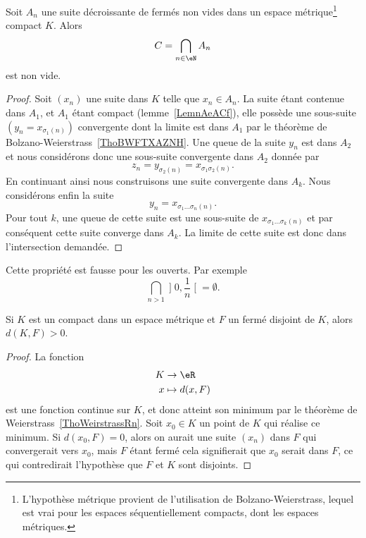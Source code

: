 \begin{lemma}       \label{LemooynkH}
	Soit \( A_n\) une suite décroissante de fermés non vides dans un espace métrique\footnote{L'hypothèse métrique provient de l'utilisation de Bolzano-Weierstrass, lequel est vrai pour les espaces séquentiellement compacts, dont les espaces métriques.} compact \( K\). Alors
	\begin{equation}
		C=\bigcap_{n\in \eN}A_n
	\end{equation}
	est non vide.
\end{lemma}

\begin{proof}
	Soit \( (x_n)\) une suite dans \( K\) telle que \( x_n\in A_n\). La suite étant contenue dans \( A_1\), et \( A_1\) étant compact (lemme~\ref{LemnAeACf}), elle possède une sous-suite \( (y_n=x_{\sigma_1(n)})\) convergente dont la limite est dans \( A_1\) par le théorème de Bolzano-Weierstrass~\ref{ThoBWFTXAZNH}. Une queue de la suite \( y_n\) est dans \( A_2\) et nous considérons donc une sous-suite convergente dans \( A_2\) donnée par
	\begin{equation}
		z_n=y_{\sigma_2(n)}=x_{\sigma_1\sigma_2(n)}.
	\end{equation}
	En continuant ainsi nous construisons une suite convergente dans \( A_k\). Nous considérons enfin la suite
	\begin{equation}
		y_n=x_{\sigma_1\ldots \sigma_n(n)}.
	\end{equation}
	Pour tout \( k\), une queue de cette suite est une sous-suite de \( x_{\sigma_1\ldots \sigma_k(n)}\) et par conséquent cette suite converge dans \( A_k\). La limite de cette suite est donc dans l'intersection demandée.
\end{proof}

\begin{remark}
	Cette propriété est fausse pour les ouverts. Par exemple
	\begin{equation}
		\bigcap_{n>1}\mathopen] 0 , \frac{1}{ n } \mathclose[=\emptyset.
	\end{equation}
\end{remark}

\begin{lemma}   \label{LemKIcAbic}
	Si \( K\) est un compact dans un espace métrique et \( F\) un fermé disjoint de \( K\), alors \( d(K,F)>0\).
\end{lemma}

\begin{proof}
	La fonction
	\begin{equation}
		\begin{aligned}
			K & \to \eR        \\
			x & \mapsto d(x,F)
		\end{aligned}
	\end{equation}
	est une fonction continue sur \( K\), et donc atteint son minimum par le théorème de Weierstrass~\ref{ThoWeirstrassRn}. Soit \( x_0\in K\) un point de \( K\) qui réalise ce minimum. Si \( d(x_0,F)=0\), alors on aurait une suite \( (x_n)\) dans \( F\) qui convergerait vers \( x_0\), mais \( F\) étant fermé cela signifierait que \( x_0\) serait dans \( F\), ce qui contredirait l'hypothèse que \( F\) et \( K\) sont disjoints.
\end{proof}

